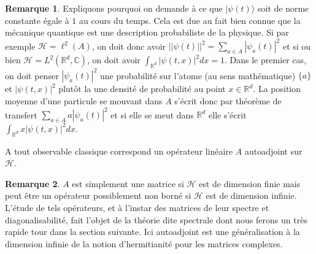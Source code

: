 \documentclass[12pt,openany,a4paper, titlepage]{article}
\newcommand{\R}{\mathbb{R}}
\newcommand{\C}{\mathbb{C}}
\newcommand{\HH}{\mathcal{H}}
\theoremstyle{definition}
\theoremstyle{definition}
\theoremstyle{definition}
\theoremstyle{definition}
\theoremstyle{definition}
\newtheorem{rem}{Remarque}
\theoremstyle{definition}
\begin{document}
\begin{rem}
    Expliquons pourquoi on demande à ce que $|\psi(t)\rangle$ soit de norme constante égale à $1$ au cours du temps. Cela est due au fait bien connue que la mécanique quantique est une description probabiliste de la physique. Si par exemple $\HH = \ell^2(A)$, on doit donc avoir $||\psi(t)||^2 = \sum_{a\in A} |\psi_a(t)|^2$ et si ou bien $\HH = L^2(\R^d,\C)$, on doit avoir $\int_{\R^d}|\psi(t,x)|^2dx = 1$. Dans le premier cas, on doit penser $|\psi_a(t)|^2$ une probabilité sur l'atome (au sens mathématique) $\{a\}$ et $|\psi(t,x)|^2$ plutôt la une densité de probabilité au point $x \in \R^d$. La position moyenne d'une particule se mouvant dans $A$ s'écrit donc par théorème de transfert $\sum_{a\in A} a|\psi_a(t)|^2$ et si elle se meut dans $\R^d$ elle s'écrit $\int_{\R^d}x|\psi(t,x)|^2dx$.
\end{rem}

\vspace{3mm}
\begin{tcolorbox}[colback=gray!5!white,
                  colframe=gray!80!white,
                  title= Postulat 2 : Principe de correspondance ]
A tout observable classique correspond un opérateur linéaire $A$ autoadjoint sur $\HH$.
\end{tcolorbox}
\vspace{3mm}

\begin{rem}
    $A$ est simplement une matrice si $\HH$ est de dimension finie mais peut être un opérateur possiblement non borné si $\HH$ est de dimension infinie. L'étude de tels opérateurs, et à l'instar des matrices de leur spectre et diagonalisabilité, fait l'objet de la théorie dite spectrale dont nous ferons un très rapide tour dans la section suivante. Ici autoadjoint est une généralisation à la dimension infinie de la notion d'hermitianité pour les matrices complexes.
\end{rem}
\end{document}
